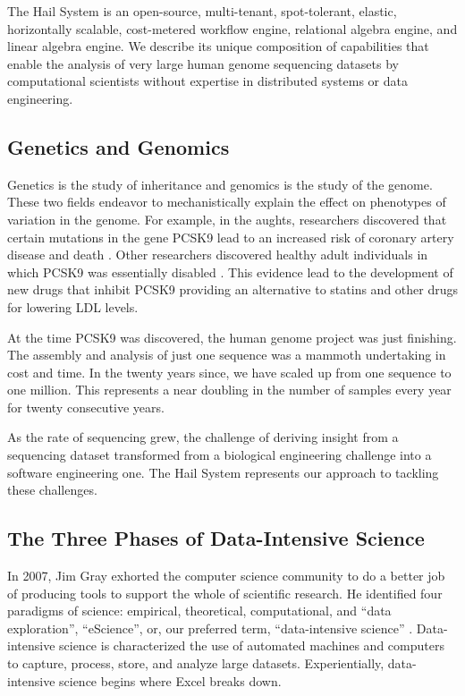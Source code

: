 \documentclass[10pt,a4paper%
]{article}
\begin{document}
The Hail System is an open-source, multi-tenant, spot-tolerant, elastic, horizontally scalable,
cost-metered workflow engine, relational algebra engine, and linear algebra engine. We describe its
unique composition of capabilities that enable the analysis of very large human genome sequencing
datasets by computational scientists without expertise in distributed systems or data engineering.

\subsection{Genetics and Genomics}

Genetics is the study of inheritance and genomics is the study of the genome. These two fields
endeavor to mechanistically explain the effect on phenotypes of variation in the genome. For
example, in the aughts, researchers discovered that certain mutations in the gene PCSK9 lead to an
increased risk of coronary artery disease and death \cite{Hall2013-us}\cite{Abifadel2003-lb}. Other
researchers discovered healthy adult individuals in which PCSK9 was essentially disabled
\cite{pcsk9-insights}. This evidence lead to the development of new drugs that inhibit PCSK9
providing an alternative to statins and other drugs for lowering LDL levels.

At the time PCSK9 was discovered, the human genome project was just finishing. The assembly and
analysis of just one sequence was a mammoth undertaking in cost and time. In the twenty years since,
we have scaled up from one sequence to one million. This represents a near doubling in the number of
samples every year for twenty consecutive years.

As the rate of sequencing grew, the challenge of deriving insight from a sequencing dataset
transformed from a biological engineering challenge into a software engineering one. The Hail System
represents our approach to tackling these challenges.

\subsection{The Three Phases of Data-Intensive Science}

In 2007, Jim Gray exhorted the computer science community to do a better job of producing tools to
support the whole of scientific research. He identified four paradigms of science: empirical,
theoretical, computational, and ``data exploration'', ``eScience'', or, our preferred term,
``data-intensive science'' \cite{fourthparadigm-chapter-1}. Data-intensive science is characterized
the use of automated machines and computers to capture, process, store, and analyze large
datasets. Experientially, data-intensive science begins where Excel breaks down.
\end{document}
